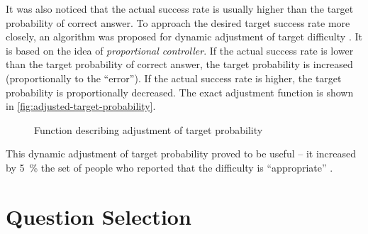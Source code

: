 \documentclass[12pt, twoside]{fithesis2}
\renewcommand{\_}{\leavevmode \kern0.07em\vbox{\hrule width0.4em}}
\begin{document}
It was also noticed that the actual success rate is usually higher than the target probability of correct answer.
To approach the desired target success rate more closely, an algorithm was proposed for dynamic adjustment of target difficulty \cite{slepe-mapy-motivation}.
It is based on the idea of \textit{proportional controller}.
If the actual success rate is lower than the target probability of correct answer, the target probability is increased (proportionally to the ``error'').
If the actual success rate is higher, the target probability is proportionally decreased.
The exact adjustment function is shown in \autoref{fig:adjusted-target-probability}.

\begin{figure}[h]
  \centering
  \caption{Function describing adjustment of target probability}
  \label{fig:adjusted-target-probability}
\end{figure}

This dynamic adjustment of target probability proved to be useful -- it increased by 5~\% the set of people who reported that the difficulty is ``appropriate'' \cite{slepe-mapy-motivation}.


\section{Question Selection}
\label{sec:question-selection}
\end{document}

